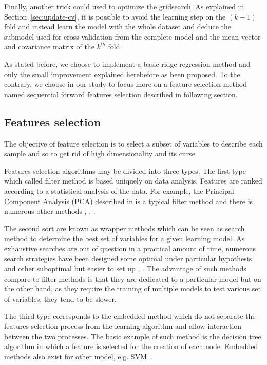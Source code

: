 \documentclass[a4paper,11pt,DIV=16,abstracton]{scrartcl}
\begin{document}
        Finally, another trick could used to optimize the gridsearch. As explained in Section~\ref{sec:update-cv}, it is possible to avoid the learning step on the $(k-1)$ fold and instead learn the model with the whole dataset and deduce the submodel used for cross-validation from the complete model and the mean vector and covariance matrix of the $k^{th}$ fold.

        As stated before, we choose to implement a basic ridge regression method and only the small improvement explained herebefore as been proposed. To the contrary, we choose in our study to focus more on a feature selection method named sequential forward features selection described in following section.

    \subsection{Features selection}
    \label{sec:selection}

    The objective of feature selection is to select a subset of variables to describe each sample and so to get rid of high dimensionality and its curse.

    Features selection algorithms may be divided into three types. The first type which called filter method is based uniquely on data analysis. Features are ranked according to a statistical analysis of the data. For example, the Principal Component Analysis (PCA) described in \cite{jimenez1998supervised} is a typical filter method and there is numerous other methods \cite{bruzzone1995extension}, \cite{biesiada2007feature}, \cite{demir2008phase}.

    The second sort are known as wrapper methods which can be seen as search method to determine the best set of variables for a given learning model. As exhaustive searches are out of question in a practical amount of time, numerous search strategies have been designed some optimal under particular hypothesis \cite{narendra1977branch} and other suboptimal but easier to set up \cite{whitney1971direct}, \cite{somol1999adaptive}. The advantage of such methods compare to filter methods is that they are dedicated to a particular model but on the other hand, as they require the training of multiple models to test various set of variables, they tend to be slower.

    The third type corresponds to the embedded method which do not separate the features selection process from the learning algorithm and allow interaction between the two processes. The basic example of such method is the decision tree algorithm in which a feature is selected for the creation of each node. Embedded methods also exist for other model, e.g. SVM \cite{guyon2002gene} \cite{weston2003use}.
\end{document}
